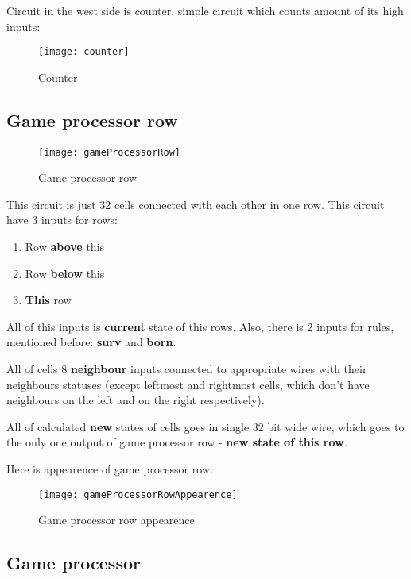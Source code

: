 Circuit in the west side is counter, simple circuit which counts amount of its high inputs:

\begin{figure}[ht]
	\centering
	\texttt{[image: counter]}
	\caption{Counter}
\end{figure}

\subsection*{Game processor row}

\begin{figure}[ht]
	\centering
	\texttt{[image: gameProcessorRow]}
	\caption{Game processor row}
\end{figure}

This circuit is just 32 cells connected with each other in one row. This circuit have 3 inputs for rows:

\begin{enumerate}
	\item Row \textbf{above} this
	\item Row \textbf{below} this
	\item \textbf{This} row
\end{enumerate}

All of this inputs is \textbf{current} state of this rows.
Also, there is 2 inputs for rules, mentioned before: \textbf{surv} and \textbf{born}.

All of cells 8 \textbf{neighbour} inputs connected to appropriate wires with their neighbours statuses (except leftmost and rightmost cells, which don't have neighbours on the left and on the right respectively).

All of calculated \textbf{new} states of cells goes in single 32 bit wide wire, which goes to the only one output of game processor row - \textbf{new state of this row}.

Here is appearence of game processor row:

\begin{figure}[ht]
	\centering
	\texttt{[image: gameProcessorRowAppearence]}
	\caption{Game processor row appearence}
\end{figure}

\subsection*{Game processor}


